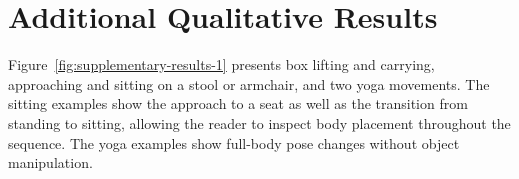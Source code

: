 \documentclass{article} %
\begin{document}
% 
% 
% 
% 
% 
% 
% 
% 

\FloatBarrier



\clearpage
\appendix
\section{Additional Qualitative Results}

Figure~\ref{fig:supplementary-results-1} presents box lifting and carrying, approaching and sitting on a stool or armchair, and two yoga movements. The sitting examples show the approach to a seat as well as the transition from standing to sitting, allowing the reader to inspect body placement throughout the sequence. The yoga examples show full-body pose changes without object manipulation.
\end{document}
